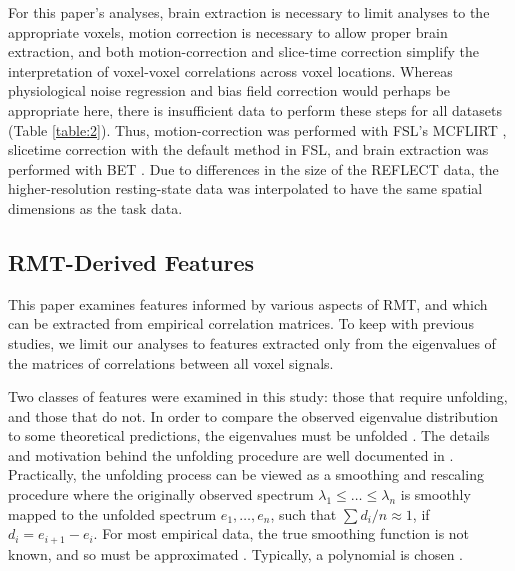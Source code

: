 \documentclass[NETN,manuscript]{stjour-new}
\begin{document}
For this paper’s analyses, brain extraction is necessary to limit analyses to the appropriate
voxels, motion correction is necessary to allow proper brain extraction, and both motion-correction
and slice-time correction simplify the interpretation of voxel-voxel correlations across voxel
locations. Whereas physiological noise regression and bias field correction would perhaps be
appropriate here, there is insufficient data to perform these steps for all datasets (Table \ref{table:2}).
Thus, motion-correction was performed with FSL's MCFLIRT
\citep{jenkinsonImprovedOptimizationRobust2002}, slicetime correction with the default method in
FSL, and brain extraction was performed with BET \citep{smithFastRobustAutomated2002}. Due to
differences in the size of the REFLECT data, the higher-resolution resting-state data was
interpolated to have the same spatial dimensions as the task data.

\subsection{RMT-Derived Features}
This paper examines features informed by various aspects of RMT, and which can be extracted from
empirical correlation matrices. To keep with previous studies, we limit our analyses to features
extracted only from the eigenvalues of the matrices of correlations between all voxel signals.

Two classes of features were examined in this study: those that require unfolding, and those that do
not. In order to compare the observed eigenvalue distribution to some theoretical predictions, the
eigenvalues must be unfolded \citep{guhrRandommatrixTheoriesQuantum1998a,mehtaRandomMatrices2004}.
The details and motivation behind the unfolding procedure are well documented in
\cite{guhrRandommatrixTheoriesQuantum1998a}. Practically, the unfolding process can be viewed as a
smoothing and rescaling procedure where the originally observed spectrum \(\lambda_1 \le \dots \le
\lambda_n\) is smoothly mapped to the unfolded spectrum \(e_1, \dots, e_n\), such that \(\sum d_i/n
\approx 1\), if \(d_i = e_{i+1} - e_i \). For most empirical data, the true smoothing function is
not known, and so must be approximated
\citep{guhrRandommatrixTheoriesQuantum1998a,mehtaRandomMatrices2004}. Typically, a polynomial is
chosen \citep{abul-magdUnfoldingSpectrumChaotic2014}.
\end{document}
